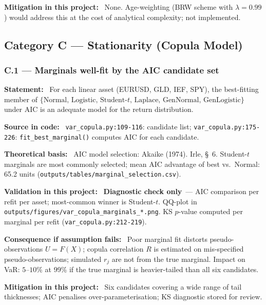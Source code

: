 \documentclass[11pt,a4paper]{article}
\newcommand{\asmfield}[1]{\medskip\noindent\textbf{#1:}\ }
\newcommand{\code}[1]{\texttt{#1}}
\newcommand{\diagnostic}{\textbf{Diagnostic check only}}
\begin{document}
\asmfield{Mitigation in this project}
None. Age-weighting (BRW scheme with $\lambda = 0.99$) would address
this at the cost of analytical complexity; not implemented.

\subsection{Category C --- Stationarity (Copula Model)}\label{sec:catC}

\subsubsection{C.1 --- Marginals well-fit by the AIC candidate set}\label{asm:C1}

\asmfield{Statement}
For each linear asset (EURUSD, GLD, IEF, SPY), the best-fitting member of
$\{\text{Normal, Logistic, Student-}t\text{, Laplace, GenNormal,
GenLogistic}\}$ under AIC is an adequate model for the return distribution.

\asmfield{Source in code}
\code{var\_copula.py:109-116}: candidate list; \code{var\_copula.py:175-226}:
\code{fit\_best\_marginal()} computes AIC for each candidate.

\asmfield{Theoretical basis}
AIC model selection: Akaike (1974). Irle, \S~6. Student-$t$ marginals are
most commonly selected; mean AIC advantage of best vs.\ Normal: 65.2 units
(\code{outputs/tables/marginal\_selection.csv}).

\asmfield{Validation in this project}
\diagnostic\ --- AIC comparison per refit per asset; most-common winner is
Student-$t$. QQ-plot in \code{outputs/figures/var\_copula\_marginals\_*.png}.
KS $p$-value computed per marginal per refit (\code{var\_copula.py:212-219}).

\asmfield{Consequence if assumption fails}
Poor marginal fit distorts pseudo-observations $U = F(X)$; copula
correlation $R$ is estimated on mis-specified pseudo-observations; simulated
$r_j$ are not from the true marginal. Impact on VaR: $5$--$10\%$ at 99\%
if the true marginal is heavier-tailed than all six candidates.

\asmfield{Mitigation in this project}
Six candidates covering a wide range of tail thicknesses; AIC penalises
over-parameterisation; KS diagnostic stored for review.

\end{document}

